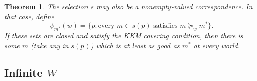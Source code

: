 \documentclass[11pt]{article}
\newtheorem{theorem}{Theorem}[section]
\theoremstyle{definition}
\theoremstyle{remark}
\newcommand{\supp}{\operatorname{supp}}
\newcommand{\given}{\,:\,}
\begin{document}
\begin{theorem}
	The selection $s$ may also be a nonempty-valued
	correspondence. In that case, define
	\[
	\psi_{m^*}(w)
	=
	\{p:\text{every }m\in s(p)
	\text{ satisfies }m\succeq_w m^*\}.
	\]
	If these sets are closed and satisfy the KKM covering
	condition, then there is some $m$ (take any in $s(p)$) which is at least as good as $m^*$ at every world.
\end{theorem}

%	


\subsection{Infinite $W$}
\end{document}
